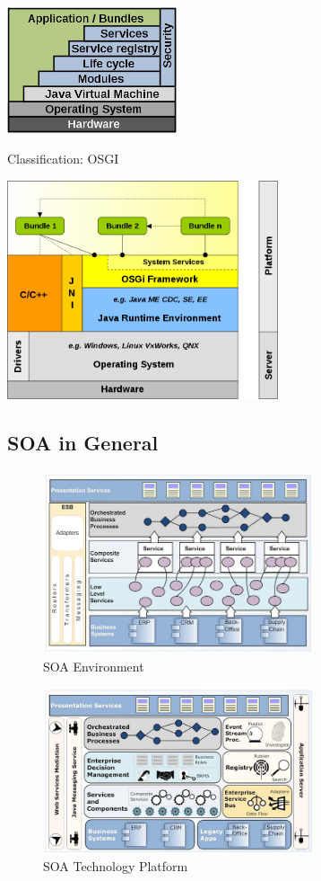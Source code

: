 \documentclass{myproc}
\begin{document}
\centerline{\includegraphics[width=5cm]{pics/osgi-01}}

\w Classification: OSGI\\

\centerline{\includegraphics[width=8cm]{pics/osgi-02}}

\eit

\subsection{SOA in General}
\begin{figure}[hbt]
\centerline{\includegraphics[width=8cm]{pics/soa}}
\caption{SOA Environment}
\end{figure}

\begin{figure}[hbt]
\centerline{\includegraphics[width=8cm]{pics/soa-platform}}
\caption{SOA Technology Platform}
\end{figure}
\end{document}

